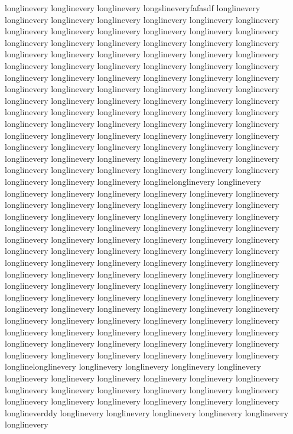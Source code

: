 $


















$





{
longlinevery longlinevery longlinevery longslineveryfafasdf longlinevery longlinevery longlinevery longlinevery longlinevery longlinevery longlinevery longlinevery longlinevery longlinevery longlinevery longlinevery longlinevery longlinevery longlinevery longlinevery longlinevery longlinevery longlinevery longlinevery longlinevery longlinevery longlinevery longlinevery longlinevery longlinevery longlinevery longlinevery longlinevery longlinevery longlinevery longlinevery longlinevery longlinevery longlinevery longlinevery longlinevery longlinevery longlinevery longlinevery longlinevery longlinevery longlinevery longlinevery longlinevery longlinevery longlinevery longlinevery longlinevery longlinevery longlinevery longlinevery longlinevery longlinevery longlinevery longlinevery longlinevery longlinevery longlinevery longlinevery longlinevery longlinevery longlinevery longlinevery longlinevery longlinevery longlinevery longlinevery longlinevery longlinevery longlinevery longlinevery longlinevery longlinevery longlinevery longlinevery longlinevery longlinevery longlinevery longlinevery longlinevery longlinevery longlinevery longlinevery longlinevery longlinevery longlinevery longlinevery longlinelonglinevery longlinevery longlinevery longlinevery longlinevery longlinevery longlinevery longlinevery longlinevery longlinevery longlinevery longlinevery longlinevery longlinevery longlinevery longlinevery longlinevery longlinevery longlinevery longlinevery longlinevery longlinevery longlinevery longlinevery longlinevery longlinevery longlinevery longlinevery longlinevery longlinevery longlinevery longlinevery longlinevery longlinevery longlinevery longlinevery longlinevery longlinevery longlinevery longlinevery longlinevery longlinevery longlinevery longlinevery longlinevery longlinevery longlinevery longlinevery longlinevery longlinevery longlinevery longlinevery longlinevery longlinevery longlinevery longlinevery longlinevery longlinevery longlinevery longlinevery longlinevery longlinevery longlinevery longlinevery longlinevery longlinevery longlinevery longlinevery longlinevery longlinevery longlinevery longlinevery longlinevery longlinevery longlinevery longlinevery longlinevery longlinevery longlinevery longlinevery longlinevery longlinevery longlinevery longlinevery longlinevery longlinevery longlinevery longlinevery longlinevery longlinevery longlinevery longlinevery longlinelonglinevery longlinevery longlinevery longlinevery longlinevery longlinevery longlinevery longlinevery longlinevery longlinevery longlinevery longlinevery longlinevery longlinevery longlinevery longlinevery longlinevery longlinevery longlinevery longlinevery longlinevery longlinevery longlinevery longlineverddy longlinevery longlinevery longlinevery longlinevery longlinevery longlinevery }
